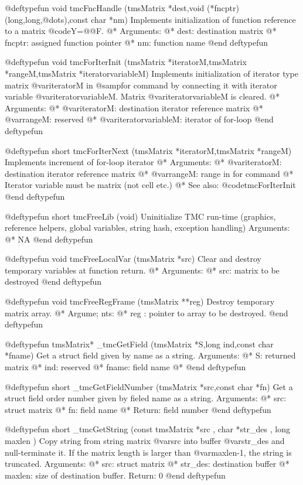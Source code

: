 @deftypefun          void tmcFncHandle (tmsMatrix *dest,void (*fncptr)(long,long,@dots{}),const char *nm)
Implements initialization of function reference to a matrix @code{Y=@@F}.	 @*
Arguments: @*
	dest: destination matrix @*
	fncptr: assigned function pointer @*
	nm: function name 
@end deftypefun


@deftypefun         void tmcForIterInit (tmsMatrix *iteratorM,tmsMatrix *rangeM,tmsMatrix *iteratorvariableM)
Implements 	initialization of iterator type matrix @var{iteratorM} in @samp{for} command by connecting it with
 iterator variable @var{iteratorvariableM}. Matrix @var{iteratorvariableM} is cleared. @*
Arguments: @*
@var{iteratorM}: destination iterator reference matrix @*
@var{rangeM}: reserved @*
@var{iteratorvariableM}: iterator of for-loop
@end deftypefun


@deftypefun        short tmcForIterNext (tmsMatrix *iteratorM,tmsMatrix *rangeM)
Implements increment of for-loop iterator	 @*
Arguments: @*
@var{iteratorM}: destination iterator reference matrix @*
@var{rangeM}: range in for command @*
Iterator variable must be matrix (not cell etc.) @*
See also: @code{tmcForIterInit}
@end deftypefun


@deftypefun         short tmcFreeLib (void)
Uninitialize TMC run-time (graphics, reference helpers, global variables, string hash, exception handling)	
Arguments: @*
NA
@end deftypefun


@deftypefun         void tmcFreeLocalVar (tmsMatrix *src)
Clear and destroy temporary variables at function return.	 @*
Arguments: @*
src: matrix to be destroyed
@end deftypefun


@deftypefun          void tmcFreeRegFrame (tmsMatrix **reg)
Destroy temporary matrix array.	 @*
Argume; nts: @*
reg : pointer to array to be destroyed. 
@end deftypefun


@deftypefun      tmsMatrix* _tmcGetField (tmsMatrix *S,long ind,const char *fname)
Get a struct field given by name as a string.
Arguments: @*
S: returned matrix @*
ind: reserved @*
fname: field name @*
@end deftypefun


@deftypefun       short  _tmcGetFieldNumber (tmsMatrix *src,const char *fn)
Get a struct field order number given by fieled name as a string.
Arguments: @*
src:   struct matrix @*
fn: field name @*
Return: field number 
@end deftypefun



@deftypefun  short _tmcGetString (const tmsMatrix *src , char *str_des , long maxlen )
Copy string  from   string matrix @var{src} into buffer @var{str_des} and null-terminate it. If the matrix length is larger than @var{maxlen}-1, the string is truncated.
Arguments: @*
src:   struct matrix @*
str_des: destination buffer @*
maxlen: size of destination buffer.
Return: 0
@end deftypefun


